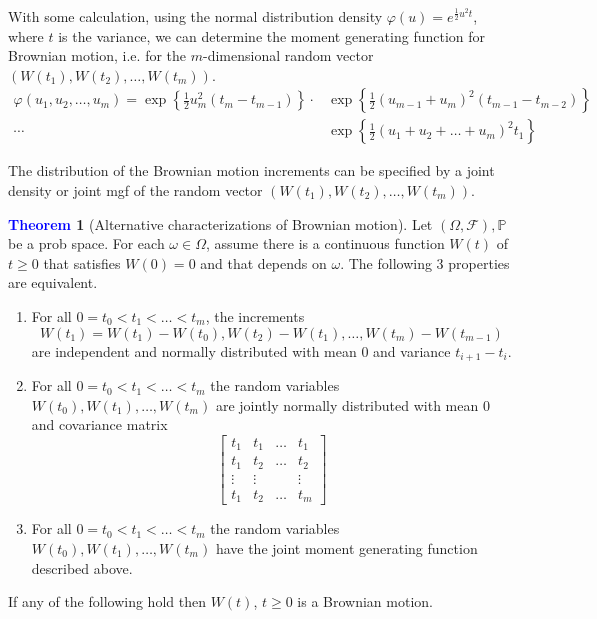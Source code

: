 \documentclass[11pt]{article}
\theoremstyle{definition}
\theoremstyle{definition}
\newtheorem{theorem}{\textcolor{blue}{Theorem}}
\theoremstyle{definition}
\theoremstyle{remark}
\begin{document}
With some calculation, using the normal distribution density $\varphi(u) = e^{\frac{1}{2}u^2 t}$, where $t$ is the variance,
we can determine the moment generating function for Brownian motion, i.e. for the $m$-dimensional random vector
$(W(t_1), W(t_2), \dots, W(t_m))$.    
\begin{align*}
    \varphi(u_1, u_2, \dots, u_m) = \exp{ \left\{\frac{1}{2}u_m^2 (t_m - t_{m - 1})\right\}}
    \cdot &\exp{ \left\{\frac{1}{2}(u_{m - 1} + u_m)^2 (t_{m - 1} - t_{m - 2})\right\}} \\
    \cdots &\exp{ \left\{\frac{1}{2}(u_1 + u_2 + \dots + u_m)^2 t_1\right\}}
\end{align*}

The distribution of the Brownian motion increments can be specified by a joint density or joint mgf of the random vector
$(W(t_1), W(t_2), \dots, W(t_m))$.

\begin{theorem}[Alternative characterizations of Brownian motion]
    Let $(\Omega, \mathcal{F}), \mathbb{P}$ be a prob space. For each $\omega \in \Omega$, assume there is a continuous function 
    $W(t)$ of $t \geq 0$ that satisfies $W(0) = 0$ and that depends on $\omega$. The following 3 properties are equivalent.
    \begin{enumerate}
        \item For all $0 = t_0 < t_1 < \dots < t_m$, the increments 
        \[
            W(t_1) = W(t_1) - W(t_0), W(t_2) - W(t_1), \dots, W(t_m) - W(t_{m - 1})
        \]  
        are independent and normally distributed with mean 0 and variance $t_{i + 1} - t_i$.
        \item For all $0 = t_0 < t_1 < \dots < t_m$ the random variables $W(t_0), W(t_1), \dots , W(t_m)$ are
        jointly normally distributed with mean $0$ and covariance matrix
        \[
            \begin{bmatrix}
            t_1 & t_1 & \dots & t_1 \\
            t_1 & t_2 & \dots & t_2 \\
            \vdots & \vdots & & \vdots \\
            t_1 & t_2 & \dots & t_m
            \end{bmatrix}
        \] 
        \item For all $0 = t_0 < t_1 < \dots < t_m$ the random variables $W(t_0), W(t_1), \dots , W(t_m)$ have 
        the joint moment generating function described above.
    \end{enumerate}   
    If any of the following hold then $W(t)$, $t \geq 0$ is a Brownian motion.  
\end{theorem}
\end{document}
